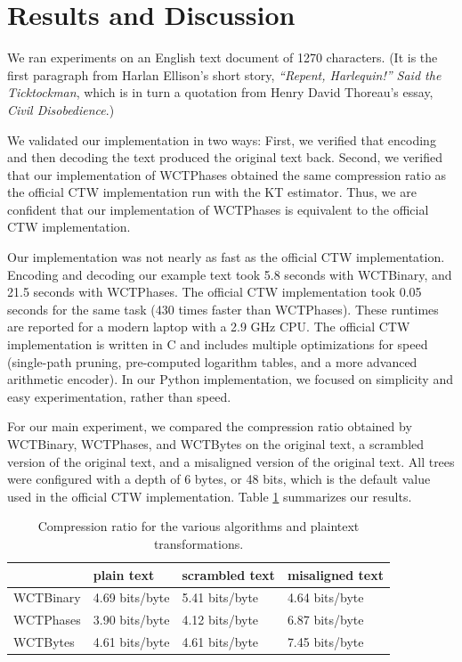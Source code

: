 \documentclass[11pt]{scrartcl}
\begin{document}
\section{Results and Discussion}

We ran experiments on an English text document of 1270 characters. (It is the
first paragraph from Harlan Ellison's short story, {\em ``Repent, Harlequin!''
Said the Ticktockman}, which is in turn a quotation from Henry David Thoreau's
essay, {\em Civil Disobedience}.)

We validated our implementation in two ways: First, we verified that encoding
and then decoding the text produced the original text back. Second, we verified
that our implementation of WCTPhases obtained the same compression ratio as the
official CTW implementation run with the KT estimator. Thus, we are confident
that our implementation of WCTPhases is equivalent to the official CTW
implementation.

Our implementation was not nearly as fast as the official CTW implementation.
Encoding and decoding our example text took 5.8 seconds with WCTBinary, and
21.5 seconds with WCTPhases. The official CTW implementation took 0.05 seconds
for the same task (430 times faster than WCTPhases). These runtimes are
reported for a modern laptop with a 2.9 GHz CPU. The official CTW
implementation is written in C and includes multiple optimizations for speed
(single-path pruning, pre-computed logarithm tables, and a more advanced
arithmetic encoder). In our Python implementation, we focused on simplicity and
easy experimentation, rather than speed.

For our main experiment, we compared the compression ratio obtained by
WCTBinary, WCTPhases, and WCTBytes on the original text, a scrambled version of
the original text, and a misaligned version of the original text. All trees
were configured with a depth of 6 bytes, or 48 bits, which is the default value
used in the official CTW implementation. Table \ref{tab:results} summarizes our
results.

\begin{table}[h!]
    \centering
    \begin{tabular}{l|lll}
        & plain text & scrambled text & misaligned text \\
        \hline
        WCTBinary & 4.69 bits/byte & 5.41 bits/byte & 4.64 bits/byte \\
        WCTPhases & 3.90 bits/byte & 4.12 bits/byte & 6.87 bits/byte \\
        WCTBytes  & 4.61 bits/byte & 4.61 bits/byte & 7.45 bits/byte \\
    \end{tabular}
    \caption{Compression ratio for the various algorithms and plaintext
    transformations.}
    \label{tab:results}
\end{table}
\end{document}
